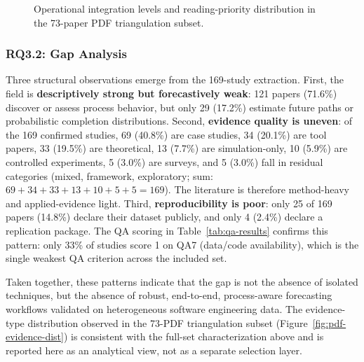 \begin{figure}[p]
\centering
{}
\caption{Operational integration levels and reading-priority distribution in the 73-paper PDF triangulation subset.}
\label{fig:pdf-integration-priority}
\end{figure}

\subsubsection{RQ3.2: Gap Analysis}

Three structural observations emerge from the 169-study extraction. First,
the field is \textbf{descriptively strong but forecastively weak}: 121
papers (71.6\%) discover or assess process behavior, but only 29 (17.2\%)
estimate future paths or probabilistic completion distributions. Second,
\textbf{evidence quality is uneven}: of the 169 confirmed studies, 69
(40.8\%) are case studies, 34 (20.1\%) are tool papers, 33 (19.5\%) are
theoretical, 13 (7.7\%) are simulation-only, 10 (5.9\%) are controlled
experiments, 5 (3.0\%) are surveys, and 5 (3.0\%) fall in residual
categories (mixed, framework, exploratory; sum: $69+34+33+13+10+5+5 = 169$).
The literature is therefore method-heavy and applied-evidence light. Third, \textbf{reproducibility is poor}: only 25 of 169 papers
(14.8\%) declare their dataset publicly, and only 4 (2.4\%) declare a
replication package. The QA scoring in Table~\ref{tab:qa-results} confirms
this pattern: only 33\% of studies score 1 on QA7 (data/code availability),
which is the single weakest QA criterion across the included set.

Taken together, these patterns indicate that the gap is not the absence of
isolated techniques, but the absence of robust,
end-to-end, process-aware forecasting workflows validated on heterogeneous
software engineering data. The evidence-type distribution observed in the
73-PDF triangulation subset (Figure~\ref{fig:pdf-evidence-dist}) is
consistent with the full-set characterization above and is reported here as
an analytical view, not as a separate selection layer.

